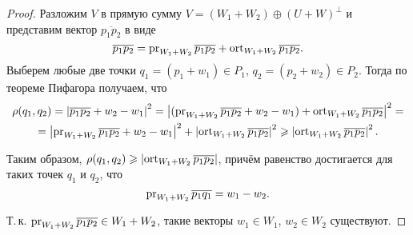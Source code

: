 \begin{proof}
    Разложим $V$ в прямую сумму $V = (W_1 + W_2) \oplus (U + W)^\perp$ и представим вектор $\overline{p_1p_2}$ в виде
    \[
        \overline{p_1p_2} = \operatorname{pr}_{W_1 + W_2}\overline{p_1p_2} + \operatorname{ort}_{W_1 + W_2}\overline{p_1p_2}.
    \]
    Выберем любые две точки $q_1 = (p_1 + w_1) \in P_1$, $q_2 = (p_2 + w_2) \in P_2$. Тогда по теореме Пифагора получаем, что
    \begin{multline*}
        \rho(q_1, q_2) = \left\lvert\overline{p_1p_2} + w_2 - w_1\right\rvert^2 = \left\lvert(\operatorname{pr}_{W_1 + W_2}\overline{p_1p_2} + w_2 - w_1) + \operatorname{ort}_{W_1 + W_2}\overline{p_1p_2}\right\rvert^2 =\\ = \left\lvert\operatorname{pr}_{W_1 + W_2}\overline{p_1p_2} + w_2 - w_1\right\rvert^2 + \left\lvert\operatorname{ort}_{W_1 + W_2}\overline{p_1p_2}\right\rvert^2 \geqslant \left\lvert\operatorname{ort}_{W_1 + W_2}\overline{p_1p_2}\right\rvert^2.
    \end{multline*}

    Таким образом, $\rho(q_1, q_2) \geqslant \left\lvert\operatorname{ort}_{W_1 + W_2}\overline{p_1p_2}\right\rvert$, причём равенство достигается для таких точек $q_1$ и $q_2$, что
    \[
        \operatorname{pr}_{W_1 + W_2}\overline{p_1q_1} = w_1 - w_2.
    \]

    Т.\,к. $\operatorname{pr}_{W_1 + W_2}\overline{p_1p_2} \in W_1 + W_2$, такие векторы $w_1 \in W_1$, $w_2 \in W_2$ существуют.
\end{proof}

